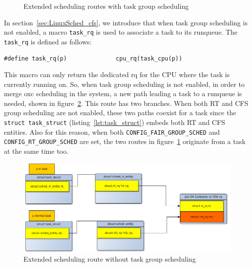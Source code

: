 \begin{figure}[htbp]
\begin{center}
\end{center}
	\caption{Extended scheduling routes with task group scheduling}
	\label{fig:scheduling_route_oxc}
\end{figure}

In section~\ref{sec:LinuxSched_cfs}, we introduce that when task group
scheduling is not enabled, a macro \texttt{task\_rq} is used to associate
a task to its runqueue. The \texttt{task\_rq} is defined as follows:
\begin{lstlisting}
#define task_rq(p)              cpu_rq(task_cpu(p))
\end{lstlisting}
This macro can only return the dedicated rq for the CPU where the task is 
currently running on. So, when task group scheduling is not enabled, in 
order to merge oxc scheduling in the system, a new path leading a task 
to a runqueue is needed, shown in figure~\ref{fig:oxc_task_no_tg}. 
This route has two branches. When both RT and CFS group scheduling are not
enabled, these two paths coexist for a task since the 
\texttt{struct task\_struct} (listing~\ref{lst:task_struct}) embeds 
both RT and CFS entities. Also for this reason, when both
\texttt{CONFIG\_FAIR\_GROUP\_SCHED} and \texttt{CONFIG\_RT\_GROUP\_SCHED}
are set, the two routes in figure~\ref{fig:scheduling_route_oxc} originate
from a task at the same time too.
\begin{figure}[htbp]
        \centering
        \includegraphics[width=\textwidth]{images/oxc_task_no_tg}
        \caption{Extended scheduling route without task group scheduling}
        \label{fig:oxc_task_no_tg}
\end{figure}

